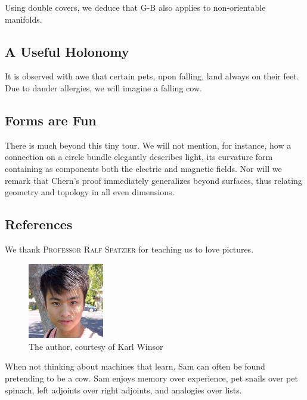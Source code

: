 \documentclass[twocolumn, 11pt]{article}
\theoremstyle{definition}
\newcommand{\msec}[1]{\subsection*{\color{mblu}\textsf{#1}}}
\begin{document}
        Using double covers, we deduce that G-B also applies to non-orientable
        manifolds.

        \newpage
    \msec{A Useful Holonomy}
        It is observed with awe that certain pets, upon falling, land always on
        their feet.  Due to dander allergies, we will imagine a falling cow.

    \msec{Forms are Fun}
        There is much beyond this tiny tour.  We will not mention, for
        instance, how a connection on a circle bundle elegantly describes
        light, its curvature form containing as components both the electric
        and magnetic fields.  Nor will we remark that Chern's proof immediately
        generalizes beyond surfaces, thus relating geometry and topology in all
        even dimensions. 

    \msec{References}
        We thank \textsc{Professor Ralf Spatzier} for teaching us to love
        pictures.

        \hrulefill
        \vspace{0.4cm}
            \begin{figure}
                \vspace{-0.4cm}
                    \includegraphics[height=3.3cm]{sam}
                \caption*{The author, courtesy of Karl Winsor}
            \end{figure}
            When not thinking about machines that learn, Sam can often be found
            pretending to be a cow.  Sam enjoys memory over experience, pet
            snails over pet spinach, left adjoints over right adjoints, and
            analogies over lists.
\end{document}
